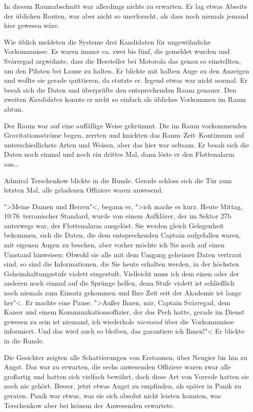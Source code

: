 \documentclass[11pt,twoside,openany]{scrbook}
\begin{document}
In diesem Raumabschnitt war allerdings nichts zu erwarten. Er lag etwas Abseits der üblichen Routen, war aber nicht so unerforscht, als dass noch niemals jemand hier gewesen wäre.

Wie üblich meldeten die Systeme drei Kandidaten für ungewöhnliche Vorkommnisse. Es waren immer ca. zwei bis fünf, die gemeldet wurden und Svårregad argwöhnte, dass die Hersteller bei Motorola das genau so einstellten, um den Piloten bei Laune zu halten. Er blickte mit halben Auge zu den Anzeigen und wollte sie gerade quittieren, da stutzte er. Irgend etwas war nicht normal. Er besah sich die Daten und überprüfte den entsprechenden Raum genauer. Den zweiten \emph{Kandidaten} konnte er nicht so einfach als übliches Vorkommen im Raum abtun.

Der Raum war auf eine auffällige Weise gekrümmt. Die im Raum vorkommenden Gravitationsströme bogen, zerrten und knickten das Raum--Zeit--Kontinuum auf unterschiedlichste Arten und Weisen, aber das hier war seltsam. Er besah sich die Daten noch einmal und noch ein drittes Mal, dann löste er den Flottenalarm aus\dots

\mbox{}

Admiral Terschenkow blickte in die Runde. Gerade schloss sich die Tür zum letzten Mal, alle geladenen Offiziere waren anwesend.

">Meine Damen und Herren"<, begann er, ">ich mache es kurz. Heute Mittag, 10:76~terranischer Standard, wurde von einem Aufklärer, der im Sektor \textsf{27b} unterwegs war, der Flottenalarm ausgelöst. Sie werden gleich Gelegenheit bekommen, sich die Daten, die dem entsprechenden Captain aufgefallen waren, mit eigenen Augen zu besehen, aber vorher möchte ich Sie noch auf einen Umstand hinweisen: Obwohl sie alle mit dem Umgang geheimer Daten vertraut sind, so sind die Informationen, die Sie heute erhalten werden, in der höchsten Geheimhaltungsstufe violett eingestuft. Vielleicht muss ich dem einen oder der anderen noch einmal auf die Sprünge helfen, denn Stufe violett ist schließlich noch niemals zum Einsatz gekommen und Ihre Zeit seit der Akademie ist lange her"<. Er machte eine Pause. ">Außer Ihnen, mir, Captain Svårregad, dem Kaiser und einem Kommunikationsoffizier, der das Pech hatte, gerade im Dienst gewesen zu sein ist niemand, ich wiederhole \emph{niemand} über die Vorkommnisse informiert. Und das wird auch so bleiben, das garantiere ich Ihnen!"< Er blickte in die Runde.

Die Gesichter zeigten alle Schattierungen von Erstaunen, über Neugier bis hin zu Angst. Das war zu erwarten, die sechs anwesenden Offiziere waren zwar alle großartig und hatten sich vielfach bewährt, doch diese Art von Vorrede hatten sie noch nie gehört. Besser, jetzt etwas Angst zu empfinden, als später in Panik zu geraten. Panik war etwas, was sie sich absolut nicht leisten konnten, was Terschenkow aber bei keinem der Anwesenden erwartete.
\end{document}
